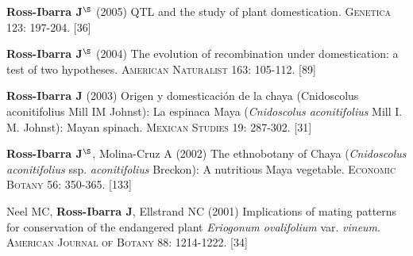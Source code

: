 \documentclass[letterpaper,10pt]{article}
\renewenvironment{itemize}{
  \begin{list}{}{
    \setlength{\leftmargin}{1.5em}
  }
}{
  \end{list}
}
\begin{document}
\begin{etaremune}
\item {\bf Ross-Ibarra J}$^\S$ (2005) QTL and the study of plant domestication.  \textsc{Genetica} 123: 197-204.
 [36]\\


\item {\bf Ross-Ibarra J}$^\S$ (2004) The evolution of recombination under domestication: a test of two hypotheses.  \textsc{American Naturalist} 163: 105-112.
 [89]\\


\item {\bf Ross-Ibarra J} (2003) Origen y domesticaci\'on de la chaya (Cnidoscolus aconitifolius Mill IM Johnst): La espinaca Maya (\emph{Cnidoscolus aconitifolius} Mill I. M. Johnst): Mayan spinach.  \textsc{Mexican Studies} 19: 287-302.
 [31]\\

\item {\bf Ross-Ibarra J}$^\S$, Molina-Cruz A (2002) The ethnobotany of Chaya (\emph{Cnidoscolus aconitifolius} ssp. \emph{aconitifolius} Breckon): A nutritious Maya vegetable. \textsc{Economic Botany} 56: 350-365.
 [133]\\

\item  Neel MC, {\bf Ross-Ibarra J}, Ellstrand NC (2001) Implications of mating patterns for conservation of the endangered plant \emph{Eriogonum ovalifolium} var. \emph{vineum}.  \textsc{American Journal of Botany} 88: 1214-1222.
 [34]\\
\end{etaremune}


\end{document}
